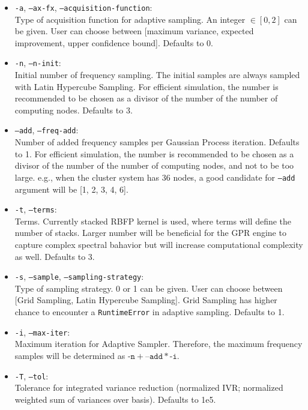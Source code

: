 \begin{itemize}
  \item \texttt{-a}, \texttt{--ax-fx}, \texttt{--acquisition-function}: 
  \\Type of acquisition function for adaptive sampling. An integer $\in [0, 2]$ can be given. User can choose between [maximum variance, expected improvement, upper confidence bound]. Defaults to 0.
  \item \texttt{-n}, \texttt{--n-init}: 
  \\Initial number of frequency sampling. The initial samples are always sampled with Latin Hypercube Sampling. For efficient simulation, the number is recommended to be chosen as a divisor of the number of the number of computing nodes. Defaults to 3.
  \item \texttt{--add}, \texttt{--freq-add}: 
  \\Number of added frequency samples per Gaussian Process iteration. Defaults to 1. For efficient simulation, the number is recommended to be chosen as a divisor of the number of the number of computing nodes, and not to be too large. e.g., when the cluster system has 36 nodes, a good candidate for \texttt{--add} argument will be [1, 2, 3, 4, 6].
  \item \texttt{-t}, \texttt{--terms}: 
  \\Terms. Currently stacked RBFP kernel is used, where terms will define the number of stacks. Larger number will be beneficial for the GPR engine to capture complex spectral bahavior but will increase computational complexity as well. Defaults to 3.
  \item \texttt{-s}, \texttt{--sample}, \texttt{--sampling-strategy}: 
  \\Type of sampling strategy. 0 or 1 can be given. User can choose between [Grid Sampling, Latin Hypercube Sampling]. Grid Sampling has higher chance to encounter a \texttt{RuntimeError} in adaptive sampling. Defaults to 1.
  \item \texttt{-i}, \texttt{--max-iter}: 
  \\Maximum iteration for Adaptive Sampler. Therefore, the maximum frequency samples will be determined as $\boxed{\texttt{-n}} + \boxed{\texttt{--add}} * \boxed{\texttt{-i}}$.
  \item \texttt{-T}, \texttt{--tol}: 
  \\Tolerance for integrated variance reduction (normalized IVR; normalized weighted sum of variances over basis). Defaults to 1e5.
\end{itemize}